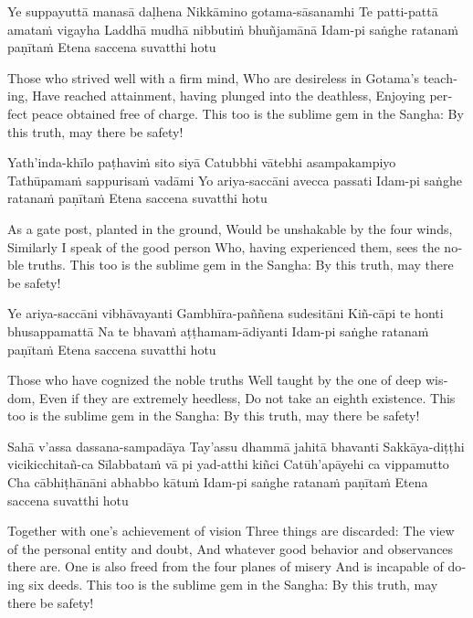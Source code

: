 Ye suppayuttā manasā daḷhena
Nikkāmino gotama-sāsanamhi
Te patti-pattā amataṁ vigayha
Laddhā mudhā nibbutiṁ bhuñjamānā
Idam-pi saṅghe ratanaṁ paṇītaṁ
Etena saccena suvatthi hotu

\begin{english}
  Those who strived well with a firm mind,
  Who are desireless in Gotama’s teaching,
  Have reached attainment, having plunged into the deathless,
  Enjoying perfect peace obtained free of charge.
  This too is the sublime gem in the Sangha:
  By this truth, may there be safety!
\end{english}

Yath’inda-khīlo paṭhaviṁ sito siyā
Catubbhi vātebhi asampakampiyo
Tathūpamaṁ sappurisaṁ vadāmi
Yo ariya-saccāni avecca passati
Idam-pi saṅghe ratanaṁ paṇītaṁ
Etena saccena suvatthi hotu

\begin{english}
  As a gate post, planted in the ground,
  Would be unshakable by the four winds,
  Similarly I speak of the good person
  Who, having experienced them, sees the noble truths.
  This too is the sublime gem in the Sangha:
  By this truth, may there be safety!
\end{english}

Ye ariya-saccāni vibhāvayanti
Gambhīra-paññena sudesitāni
Kiñ-cāpi te honti bhusappamattā
Na te bhavaṁ aṭṭhamam-ādiyanti
Idam-pi saṅghe ratanaṁ paṇītaṁ
Etena saccena suvatthi hotu

\begin{english}
  Those who have cognized the noble truths
  Well taught by the one of deep wisdom,
  Even if they are extremely heedless,
  Do not take an eighth existence.
  This too is the sublime gem in the Sangha:
  By this truth, may there be safety!
\end{english}

Sahā v’assa dassana-sampadāya
Tay’assu dhammā jahitā bhavanti
Sakkāya-diṭṭhi vicikicchitañ-ca
Sīlabbataṁ vā pi yad-atthi kiñci
Catūh’apāyehi ca vippamutto
Cha cābhiṭhānāni abhabbo kātuṁ
Idam-pi saṅghe ratanaṁ paṇītaṁ
Etena saccena suvatthi hotu

\begin{english}
  Together with one’s achievement of vision
  Three things are discarded:
  The view of the personal entity and doubt,
  And whatever good behavior and observances there are.
  One is also freed from the four planes of misery
  And is incapable of doing six deeds.
  This too is the sublime gem in the Sangha:
  By this truth, may there be safety!
\end{english}

